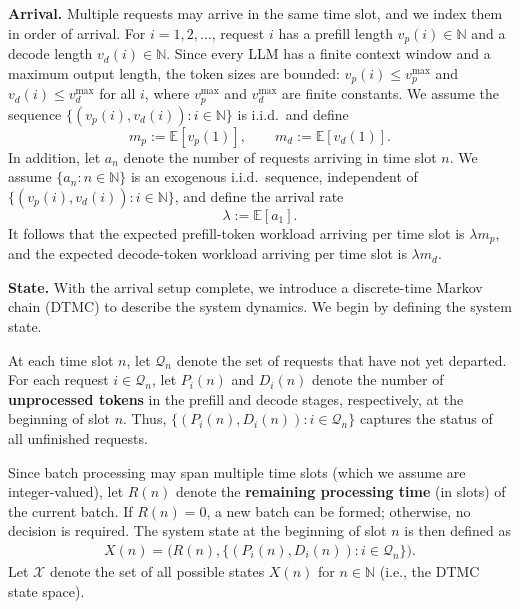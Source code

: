 \documentclass[11pt]{article}
\theoremstyle{plain}
\theoremstyle{definition}
\theoremstyle{remark}
\newcommand{\E}{\mathbb{E}}
\newcommand{\N}{\mathbb{N}}
\begin{document}
\textbf{Arrival.} Multiple requests may arrive in the same time slot, and we index them in order of arrival. For $i=1,2,\ldots$, request $i$ has a prefill length $v_p(i)\in\N$ and a decode length $v_d(i)\in\N$. Since every LLM has a finite context window and a maximum output length, the token sizes are bounded: $v_p(i)\le v_p^{\max}$ and $v_d(i)\le v_d^{\max}$ for all $i$, where $v_p^{\max}$ and $v_d^{\max}$ are finite constants. We assume the sequence $\{(v_p(i),v_d(i)) : i\in\N\}$ is i.i.d.\ and define
\[
m_p:=\E[v_p(1)],\qquad m_d:=\E[v_d(1)].
\]
In addition, let $a_n$ denote the number of requests arriving in time slot $n$. We assume $\{a_n:n\in\N\}$ is an exogenous i.i.d.\ sequence, independent of $\{(v_p(i),v_d(i)) : i\in\N\}$, and define the arrival rate
\[
\lambda := \E[a_1].
\]
It follows that the expected prefill-token workload arriving per time slot is \(\lambda m_p\), and the expected decode-token workload arriving per time slot is \(\lambda m_d\).

\textbf{State.} With the arrival setup complete, we introduce a discrete-time Markov chain (DTMC) to describe the system dynamics. We begin by defining the system state.

At each time slot \(n\), let \(\mathcal{Q}_n\) denote the set of requests that have not yet departed. For each request \(i\in\mathcal{Q}_n\), let \(P_i(n)\) and \(D_i(n)\) denote the number of \textbf{unprocessed tokens} in the prefill and decode stages, respectively, at the beginning of slot \(n\). Thus, \(\{(P_i(n), D_i(n)) : i \in \mathcal{Q}_n\}\) captures the status of all unfinished requests.  

Since batch processing may span multiple time slots (which we assume are integer-valued), let \(R(n)\) denote the \textbf{remaining processing time} (in slots) of the current batch. If \(R(n)=0\), a new batch can be formed; otherwise, no decision is required. The system state at the beginning of slot \(n\) is then defined as
\begin{align}
  \label{eq:state}
   X(n) =\Big(R(n), \{(P_i(n), D_i(n)) : i \in \mathcal{Q}_n\}\Big).
\end{align}  
Let \(\mathcal{X}\) denote the set of all possible states \(X(n)\) for \(n\in\N\) (i.e., the DTMC state space).
\end{document}
